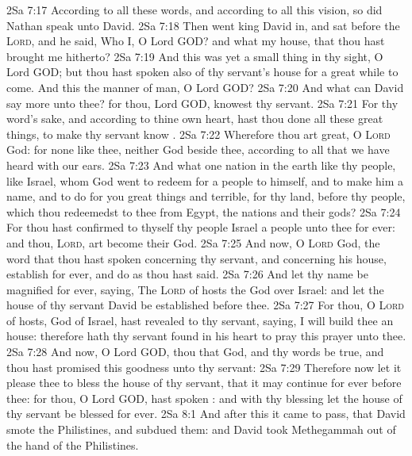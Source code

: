 \vs 2Sa 7:17 According to all these words, and according to all this vision, so did Nathan speak unto David.
\vs 2Sa 7:18 Then went king David in, and sat before the \textsc{Lord}, and he said, Who  I, O Lord GOD? and what  my house, that thou hast brought me hitherto?
\vs 2Sa 7:19 And this was yet a small thing in thy sight, O Lord GOD; but thou hast spoken also of thy servant's house for a great while to come. And  this the manner of man, O Lord GOD?
\vs 2Sa 7:20 And what can David say more unto thee? for thou, Lord GOD, knowest thy servant.
\vs 2Sa 7:21 For thy word's sake, and according to thine own heart, hast thou done all these great things, to make thy servant know .
\vs 2Sa 7:22 Wherefore thou art great, O \textsc{Lord} God: for  none like thee, neither  God beside thee, according to all that we have heard with our ears.
\vs 2Sa 7:23 And what one nation in the earth  like thy people,  like Israel, whom God went to redeem for a people to himself, and to make him a name, and to do for you great things and terrible, for thy land, before thy people, which thou redeemedst to thee from Egypt,  the nations and their gods?
\vs 2Sa 7:24 For thou hast confirmed to thyself thy people Israel  a people unto thee for ever: and thou, \textsc{Lord}, art become their God.
\vs 2Sa 7:25 And now, O \textsc{Lord} God, the word that thou hast spoken concerning thy servant, and concerning his house, establish  for ever, and do as thou hast said.
\vs 2Sa 7:26 And let thy name be magnified for ever, saying, The \textsc{Lord} of hosts  the God over Israel: and let the house of thy servant David be established before thee.
\vs 2Sa 7:27 For thou, O \textsc{Lord} of hosts, God of Israel, hast revealed to thy servant, saying, I will build thee an house: therefore hath thy servant found in his heart to pray this prayer unto thee.
\vs 2Sa 7:28 And now, O Lord GOD, thou  that God, and thy words be true, and thou hast promised this goodness unto thy servant:
\vs 2Sa 7:29 Therefore now let it please thee to bless the house of thy servant, that it may continue for ever before thee: for thou, O Lord GOD, hast spoken : and with thy blessing let the house of thy servant be blessed for ever.
\vs 2Sa 8:1 And after this it came to pass, that David smote the Philistines, and subdued them: and David took Methegammah out of the hand of the Philistines.
